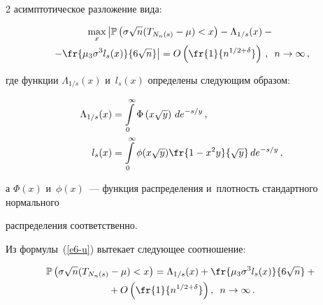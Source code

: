 \begin{multicols}{2}
асимптотическое разложение вида:

\begin{multline}

\label{e6-u}

\max\limits_{x} \left|

\vphantom{\fr{\mu_{3}\sigma^{3}l_{s}(x)}{6\sqrt{n}}}

\mathbb{P}\left( \sigma\sqrt{n}(T_{N_{n}(s)}-\mu)<x\right)

-\Lambda_{1/s}(x) - {} \right.\\

\left.- \fr{\mu_{3}\sigma^{3}l_{s}(x)}{6\sqrt{n}}\right|= 

O\left(\fr{1}{n^{1/2+\delta}}\right)\,,\enskip n \rightarrow\infty\,,

\end{multline}

где функции $\Lambda_{1/s}(x)$ и~$l_{s}(x)$ определены следующим образом: 



\noindent 

\begin{align*}

 \Lambda_{1/s}(x) &= \int\limits^{\infty}\limits_{0}{\Phi\left(x\sqrt{y}\right)\,de^{-s/y}}\,, \\

 l_{s}(x)&=\int\limits^{\infty}\limits_{0}{\phi(x\sqrt{y})\fr{1-x^{2}y}{\sqrt{y}}\,de^{-s/y}}\,, 

 \end{align*}

а $\Phi(x)$ и~$\phi(x)$~--- функция распределения и~плотность стандартного нормального 

распределения соответственно.



Из формулы~(\ref{e6-u}) вытекает следующее соотношение:  

\begin{multline}


\label{e7-u}

\mathbb{P}\left( \sigma\sqrt{n}(T_{N_{n}(s)}-\mu)<x\right)= 

\Lambda_{1/s}(x) + \fr{\mu_{3}\sigma^{3}l_{s}(x)}{6\sqrt{n}} + {}\\

{}+O\left(\fr{1}{n^{1/2+\delta}}\right),\enskip n \rightarrow\infty\,.

\end{multline}


\end{multicols}
